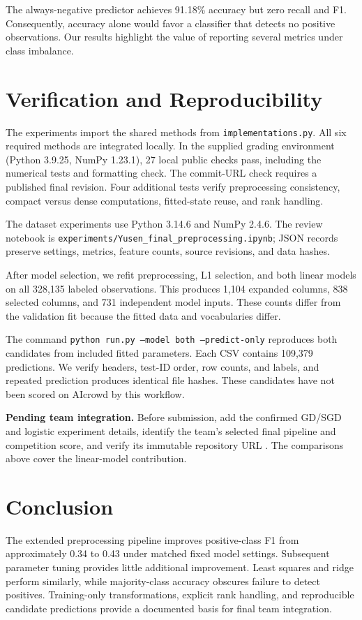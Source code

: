 \documentclass[10pt,conference,compsocconf]{IEEEtran}
\begin{document}
The always-negative predictor achieves 91.18\% accuracy
but zero recall and F1. Consequently, accuracy alone would
favor a classifier that detects no positive observations.
Our results highlight the value of reporting several
metrics under class imbalance.

\section{Verification and Reproducibility}
The experiments import the shared methods from
\texttt{implementations.py}. All six required methods are
integrated locally. In the supplied grading environment
(Python 3.9.25, NumPy 1.23.1), 27 local public checks pass,
including the numerical tests and formatting check.
The commit-URL check requires a published final revision.
Four additional tests verify preprocessing consistency,
compact versus dense computations, fitted-state reuse,
and rank handling.

The dataset experiments use Python 3.14.6 and NumPy 2.4.6.
The review notebook is
\texttt{experiments/Yusen\_final\_preprocessing.ipynb};
JSON records preserve settings, metrics, feature counts,
source revisions, and data hashes.

After model selection, we refit preprocessing, L1 selection,
and both linear models on all 328,135 labeled observations.
This produces 1,104 expanded columns, 838 selected columns,
and 731 independent model inputs. These counts differ from
the validation fit because the fitted data and vocabularies
differ.

The command
\texttt{python run.py --model both --predict-only}
reproduces both candidates from included fitted parameters.
Each CSV contains 109,379 predictions. We verify headers,
test-ID order, row counts, and labels, and repeated prediction
produces identical file hashes. These candidates have not
been scored on AIcrowd by this workflow.

\noindent\textbf{Pending team integration.}
Before submission, add the confirmed GD/SGD and logistic
experiment details, identify the team's selected final
pipeline and competition score, and verify its immutable
repository URL \cite{repository}. The comparisons above
cover the linear-model contribution.

\section{Conclusion}
The extended preprocessing pipeline improves positive-class
F1 from approximately 0.34 to 0.43 under matched fixed model
settings. Subsequent parameter tuning provides little
additional improvement. Least squares and ridge perform
similarly, while majority-class accuracy obscures failure
to detect positives. Training-only transformations, explicit
rank handling, and reproducible candidate predictions
provide a documented basis for final team integration.
\end{document}
